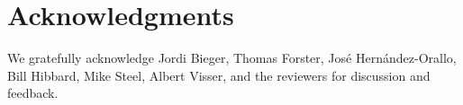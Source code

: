 \documentclass[runningheads]{llncs}
\begin{document}
\section*{Acknowledgments}

We gratefully acknowledge Jordi Bieger, Thomas Forster, Jos{\'e} Hern{\'a}ndez-Orallo,
Bill Hibbard, Mike Steel,
Albert Visser, and the reviewers for discussion and feedback.



\end{document}

